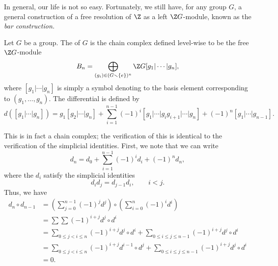 \documentclass[main.tex]{subfiles}
\begin{document}
In general, our life is not so easy. Fortunately, we still have, for any group $G$, a general construction of a free resolution of $\Z$ as a left $\Z G$-module, known as the \emph{bar construction.}

\begin{definition}
  \label{def:bar_complex_for_groups}
  Let $G$ be a group. The  of $G$ is the chain complex defined level-wise to be the free $\Z G$-module
  \begin{equation*}
    B_{n} = \bigoplus_{(g_{i}) \in (G \smallsetminus \{e\})^{n}} \Z G[g_{1} | \cdots | g_{n}],
  \end{equation*}
  where $[g_{1} | \cdots | g_{n}]$ is simply a symbol denoting to the basis element corresponding to $(g_{1}, \dots, g_{n})$. The differential is defined by
  \begin{equation*}
    d([g_{1} | \cdots | g_{n}]) = g_{1}[g_{2} | \cdots | g_{n}] + \sum_{i = 1}^{n - 1} (-1)^{i} [g_{1} | \cdots | g_{i}g_{i+1} | \cdots | g_{n}] + (-1)^{n}[g_{1} | \cdots | g_{n-1}].
  \end{equation*}
\end{definition}

This is in fact a chain complex; the verification of this is identical to the verification of the simplicial identities. First, we note that we can write
\begin{equation*}
  d_{n} = d_{0} + \sum_{i = 1}^{n-1} (-1)^{i} d_{i} + (-1)^{n}d_{n},
\end{equation*}
where the $d_{i}$ satisfy the simplicial identities
\begin{equation*}
  d_{i}d_{j} = d_{j-1}d_{i},\qquad i < j.
\end{equation*}
Thus, we have
\begin{align*}
  d_{n} \circ d_{n-1} &= \left( \sum_{j = 0}^{n-1}(-1)^{j}d^{j} \right) \circ \left( \sum_{i = 0}^{n}(-1)^{i}d^{i} \right) \\
  &= \sum\sum (-1)^{i+j} d^{j} \circ d^{i} \\
  &= \sum_{0 \leq j < i \leq n} (-1)^{i+j} d^{j} \circ d^{i} + \sum_{0 \leq i \leq j \leq n-1} (-1)^{i+j} d^{j} \circ d^{i} \\
  &= \sum_{0 \leq j < i \leq n} (-1)^{i+j} d^{i-1} \circ d^{j} + \sum_{0 \leq i \leq j \leq n-1} (-1)^{i+j} d^{j} \circ d^{i} \\
  &= 0.
\end{align*}
\end{document}
